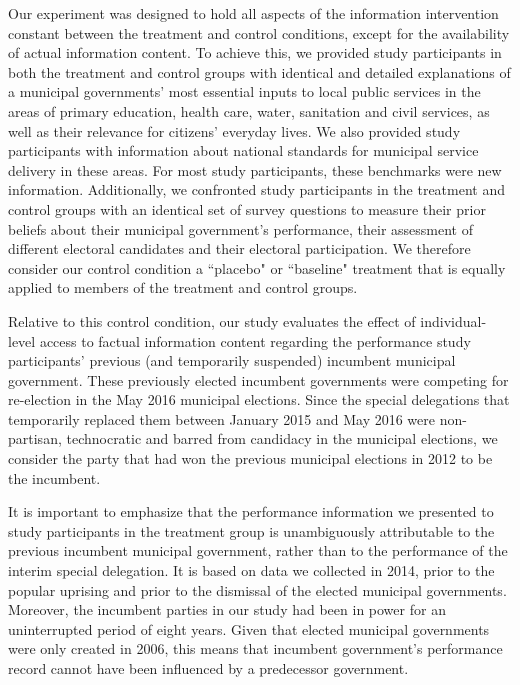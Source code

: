 \documentclass[11pt]{article}
\begin{document}
Our experiment was designed to hold all aspects of the information intervention constant between the treatment and control conditions, except for the availability of actual information content. To achieve this, we provided study participants in both the treatment and control groups with identical and detailed explanations of a municipal governments' most essential inputs to local public services in the areas of primary education, health care, water, sanitation and civil services, as well as their relevance for citizens' everyday lives. We also provided study participants with information about national standards for municipal service delivery in these areas. For most study participants, these benchmarks were new information. Additionally, we confronted study participants in the treatment and control groups with an identical set of survey questions to measure their prior beliefs about their municipal government's performance, their assessment of different electoral candidates and their electoral participation.  We therefore consider our control condition a ``placebo" or ``baseline" treatment that is equally applied to members of the treatment and control groups. 

Relative to this control condition, our study evaluates the effect of individual-level access to factual information content regarding the performance study participants' previous (and  temporarily suspended) incumbent municipal government. These previously elected incumbent governments were competing for re-election in the May 2016 municipal elections. Since the special delegations that temporarily replaced them between January 2015 and May 2016 were non-partisan, technocratic and barred from candidacy in the municipal elections, we consider the party that had won the previous municipal elections in 2012 to be the incumbent. 

It is important to emphasize that the performance information we presented to study participants in the treatment group is unambiguously attributable to the previous incumbent municipal government, rather than to the performance of the interim special delegation. It is based on data we collected in 2014, prior to the popular uprising and prior to the dismissal of the elected municipal governments. Moreover, the incumbent parties in our study had been in power for an uninterrupted period of eight years. Given that elected municipal governments were only created in 2006, this means that incumbent government's performance record cannot have been influenced by a predecessor government. 
\end{document}
